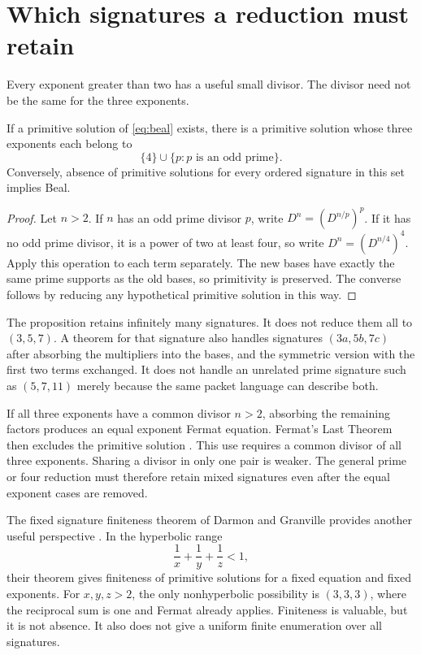 \section{Which signatures a reduction must retain}\label{sec:signatures}
Every exponent greater than two has a useful small divisor. The divisor need not be the same for the three exponents.
\begin{proposition}\label{prop:primefour}
If a primitive solution of \eqref{eq:beal} exists, there is a primitive solution whose three exponents each belong to
\[
\{4\}\cup\{p:p\text{ is an odd prime}\}.
\]
Conversely, absence of primitive solutions for every ordered signature in this set implies Beal.
\end{proposition}
\begin{proof}
Let $n>2$. If $n$ has an odd prime divisor $p$, write $D^n=(D^{n/p})^p$. If it has no odd prime divisor, it is a power of two at least four, so write $D^n=(D^{n/4})^4$. Apply this operation to each term separately. The new bases have exactly the same prime supports as the old bases, so primitivity is preserved. The converse follows by reducing any hypothetical primitive solution in this way.
\end{proof}
The proposition retains infinitely many signatures. It does not reduce them all to $(3,5,7)$. A theorem for that signature also handles signatures $(3a,5b,7c)$ after absorbing the multipliers into the bases, and the symmetric version with the first two terms exchanged. It does not handle an unrelated prime signature such as $(5,7,11)$ merely because the same packet language can describe both.

If all three exponents have a common divisor $n>2$, absorbing the remaining factors produces an equal exponent Fermat equation. Fermat's Last Theorem then excludes the primitive solution \cite{wiles1995,taylor-wiles1995}. This use requires a common divisor of all three exponents. Sharing a divisor in only one pair is weaker. The general prime or four reduction must therefore retain mixed signatures even after the equal exponent cases are removed.

The fixed signature finiteness theorem of Darmon and Granville provides another useful perspective \cite{darmon-granville1995}. In the hyperbolic range
\[
\frac1x+\frac1y+\frac1z<1,
\]
their theorem gives finiteness of primitive solutions for a fixed equation and fixed exponents. For $x,y,z>2$, the only nonhyperbolic possibility is $(3,3,3)$, where the reciprocal sum is one and Fermat already applies. Finiteness is valuable, but it is not absence. It also does not give a uniform finite enumeration over all signatures.

